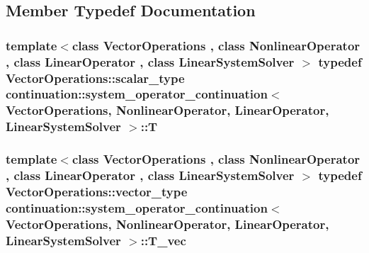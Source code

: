 \subsection{Member Typedef Documentation}
\hypertarget{classcontinuation_1_1system__operator__continuation_a56f40eb91ed7d8435aac8fa97d7ebdf1}{
\subsubsection[{T}]{\setlength{\rightskip}{0pt plus 5cm}template$<$class Vector\-Operations , class Nonlinear\-Operator , class Linear\-Operator , class Linear\-System\-Solver $>$ typedef Vector\-Operations\-::scalar\-\_\-type {\bf continuation\-::system\-\_\-operator\-\_\-continuation}$<$ Vector\-Operations, Nonlinear\-Operator, Linear\-Operator, Linear\-System\-Solver $>$\-::{\bf T}}}\label{classcontinuation_1_1system__operator__continuation_a56f40eb91ed7d8435aac8fa97d7ebdf1}
\hypertarget{classcontinuation_1_1system__operator__continuation_a429826adb9f5e048cc54fc0d2a871080}{
\subsubsection[{T\-\_\-vec}]{\setlength{\rightskip}{0pt plus 5cm}template$<$class Vector\-Operations , class Nonlinear\-Operator , class Linear\-Operator , class Linear\-System\-Solver $>$ typedef Vector\-Operations\-::vector\-\_\-type {\bf continuation\-::system\-\_\-operator\-\_\-continuation}$<$ Vector\-Operations, Nonlinear\-Operator, Linear\-Operator, Linear\-System\-Solver $>$\-::{\bf T\-\_\-vec}}}\label{classcontinuation_1_1system__operator__continuation_a429826adb9f5e048cc54fc0d2a871080}


